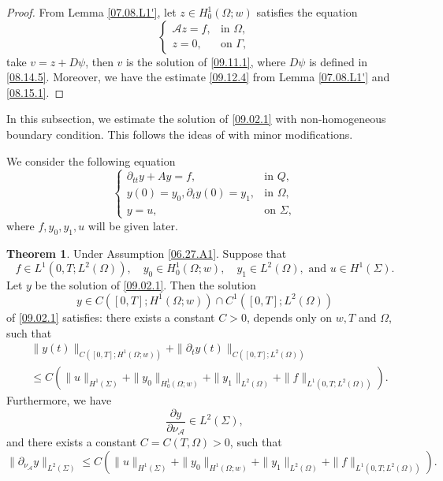 \documentclass[preprint,12pt]{elsarticle}
\theoremstyle{definition}   %
\newtheorem{theorem}{Theorem}[section]
\numberwithin{equation}{section}
\def\pt{\partial}
\def\pt{\partial}
\def\Om{\Omega}
\def\Ga{\Gamma}
\def\f{\frac}
\def\mcA{\mathcal{A}}
\begin{document}
\begin{proof}
	From Lemma \ref{07.08.L1'}, let $z\in H_0^1(\Om;w)$ satisfies the equation
	\begin{equation*}
		\begin{cases}
			\mcA z=f, &\mbox{in }\Om,\\
			z=0, &\mbox{on }\Ga, 
		\end{cases}
	\end{equation*}
	take $v=z+D\psi$, then   $v$ is the solution of \eqref{09.11.1}, where  $D\psi$ is defined in \eqref{08.14.5}.    Moreover, we have the estimate \eqref{09.12.4} from  Lemma \ref{07.08.L1'} and \eqref{08.15.1}. 
\end{proof}


In this subsection, we estimate the solution of \eqref{09.02.1} with non-homogeneous boundary condition. This follows the ideas of \cite{Bellassoued,Lasiecka1,Lasiecka2,Lions} with minor modifications.

We consider the following equation
\begin{equation}\label{09.02.1}
	\begin{cases}
		\pt_{tt}y+A y=f, &\mbox{in }Q,\\
		y(0)=y_0, \pt_ty(0)=y_1, &\mbox{in }\Om,\\
		y=u, &\mbox{on }\Sigma, 
	\end{cases}
\end{equation}
where $f, y_0, y_1, u$ will be given later.

\begin{theorem}\label{09.02.T1}
	Under Assumption \ref{06.27.A1}. Suppose that 
	\begin{equation*}
		f\in L^1(0,T; L^2(\Om)),\quad y_0\in H_0^1(\Om;w),\quad y_1\in L^2(\Om), \mbox{ and } u\in H^1(\Sigma). 
	\end{equation*} 
	Let $y$ be the solution of \eqref{09.02.1}. 	
	Then the solution
	\begin{equation*}
		y\in C([0,T]; H^1(\Om;w))\cap C^1([0,T]; L^2(\Om))
	\end{equation*}
	of \eqref{09.02.1} satisfies: there exists a constant $C>0$, depends only on $w, T$ and $\Om$,  such that 
	\begin{equation}\label{09.04.1}
		\begin{split} 
		&\|y(t)\|_{C([0,T];H^1(\Om;w))}+\|\pt_t y(t)\|_{C([0,T]; L^2(\Om))}\\
		&\leq C\left(\|u\|_{H^1(\Sigma)}+\|y_0\|_{H_0^1(\Om;w)}+\|y_1\|_{L^2(\Om)}+\|f\|_{L^1(0,T; L^2(\Om))}\right).
		\end{split} 
	\end{equation}
	Furthermore, we have 
	\begin{equation*}
		\f{\pt y}{\pt \nu_\mcA}\in L^2(\Sigma), 
	\end{equation*}
	and there exists a constant $C=C(T,\Om)>0$, such that 
	\begin{equation}\label{09.04.2}
		\|\pt_{\nu_\mcA} y\|_{L^2(\Sigma)}\leq C\left(\|u\|_{H^1(\Sigma)}+\|y_0\|_{H^1(\Om;w)}+\|y_1\|_{L^2(\Om)}+\|f\|_{L^1(0,T; L^2(\Om))}\right).
	\end{equation}
\end{theorem}
\end{document}
